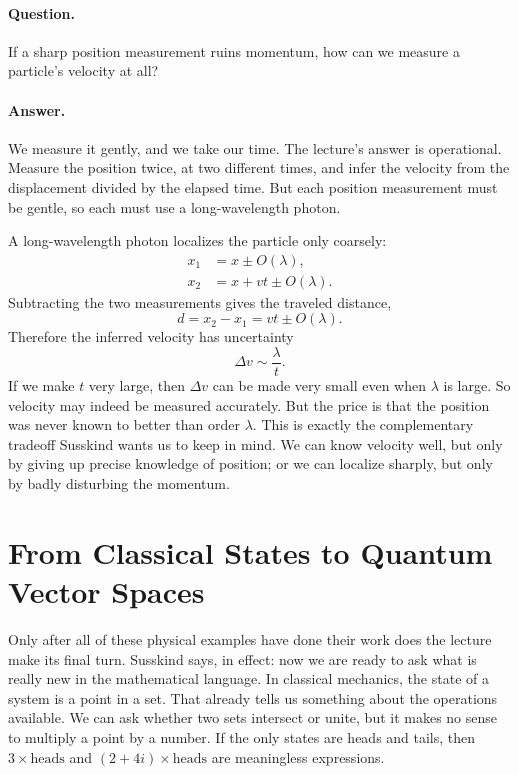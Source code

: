 \paragraph{Question.} If a sharp position measurement ruins momentum, how can we measure a particle's velocity at all?

\paragraph{Answer.} We measure it gently, and we take our time. The lecture's answer is operational. Measure the position twice, at two different times, and infer the velocity from the displacement divided by the elapsed time. But each position measurement must be gentle, so each must use a long-wavelength photon.

A long-wavelength photon localizes the particle only coarsely:
\begin{align}
x_1 &= x \pm O(\lambda),\\
x_2 &= x + vt \pm O(\lambda).
\end{align}
Subtracting the two measurements gives the traveled distance,
\begin{equation}
d=x_2-x_1 = vt \pm O(\lambda).
\end{equation}
Therefore the inferred velocity has uncertainty
\begin{equation}
\Delta v \sim \frac{\lambda}{t}.
\end{equation}
If we make \(t\) very large, then \(\Delta v\) can be made very small even when \(\lambda\) is large. So velocity may indeed be measured accurately. But the price is that the position was never known to better than order \(\lambda\). This is exactly the complementary tradeoff Susskind wants us to keep in mind. We can know velocity well, but only by giving up precise knowledge of position; or we can localize sharply, but only by badly disturbing the momentum.

\section{From Classical States to Quantum Vector Spaces}

Only after all of these physical examples have done their work does the lecture make its final turn. Susskind says, in effect: now we are ready to ask what is really new in the mathematical language. In classical mechanics, the state of a system is a point in a set. That already tells us something about the operations available. We can ask whether two sets intersect or unite, but it makes no sense to multiply a point by a number. If the only states are heads and tails, then \(3\times \text{heads}\) and \((2+4i)\times \text{heads}\) are meaningless expressions.


